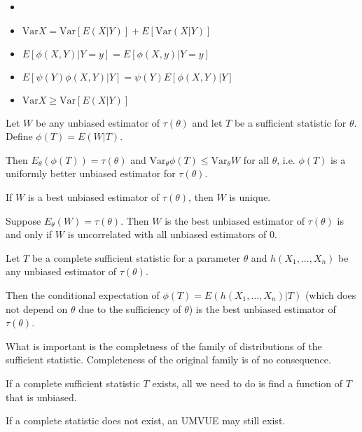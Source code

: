 \begin{note}
    \begin{itemize}
        \item[]
        \item $\text{Var}X = \text{Var}[E(X|Y)] + E[\text{Var}(X|Y)]$
        \item $E[\phi(X,Y)|Y=y] = E[\phi(X,y)|Y=y]$
        \item $E[\psi(Y) \phi(X,Y)|Y] = \psi(Y) E[\phi(X,Y)|Y]$
        \item $\text{Var}X \geq \text{Var}[E(X|Y)]$
    \end{itemize}
\end{note}

\begin{thm}
    Let $W$ be any unbiased estimator of $\tau(\theta)$ and let $T$ be a sufficient statistic for $\theta$. 
    Define $\phi(T) = E(W|T)$.

    Then $E_\theta(\phi(T)) = \tau(\theta)$ and $\text{Var}_\theta \phi(T) \leq \text{Var}_\theta W$ for all $\theta$, i.e. $\phi(T)$ is a uniformly better unbiased estimator for $\tau(\theta)$.
\end{thm}

\begin{thm}
    If $W$ is a best unbiased estimator of $\tau(\theta)$, then $W$ is unique.
\end{thm}

\begin{thm}
    Suppose $E_\theta(W) = \tau(\theta)$. Then $W$ is the best unbiased estimator of $\tau(\theta)$ is and only if $W$ is uncorrelated with all unbiased estimators of $0$.
\end{thm}

\begin{thm}
    Let $T$ be a complete sufficient statistic for a parameter $\theta$ and $h(X_1, ..., X_n)$ be any unbiased estimator of $\tau(\theta)$. 

    Then the conditional expectation of $\phi(T) = E(h(X_1, ..., X_n)|T)$ (which does not depend on $\theta$ due to the sufficiency of $\theta$) is the best unbiased estimator of $\tau(\theta)$.
\end{thm}

\begin{note}
    What is important is the completness of the family of distributions of the sufficient statistic. Completeness of the original family is of no consequence.
\end{note}

\begin{note}
    If a complete sufficient statistic $T$ exists, all we need to do is find a function of $T$ that is unbiased. 

    If a complete statistic does not exist, an UMVUE may still exist.
\end{note}
